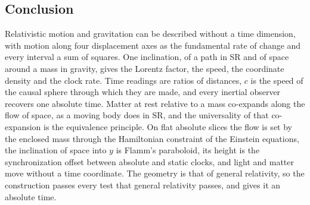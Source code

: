 \documentclass{iopjournal}
\begin{document}
\subsection{Conclusion}

Relativistic motion and gravitation can be described without a time dimension, with motion along four displacement axes as the fundamental rate of change and every interval a sum of squares. One inclination, of a path in SR and of space around a mass in gravity, gives the Lorentz factor, the speed, the coordinate density and the clock rate. Time readings are ratios of distances, $c$ is the speed of the causal sphere through which they are made, and every inertial observer recovers one absolute time. Matter at rest relative to a mass co-expands along the flow of space, as a moving body does in SR, and the universality of that co-expansion is the equivalence principle. On flat absolute slices the flow is set by the enclosed mass through the Hamiltonian constraint of the Einstein equations, the inclination of space into $y$ is Flamm's paraboloid, its height is the synchronization offset between absolute and static clocks, and light and matter move without a time coordinate. The geometry is that of general relativity, so the construction passes every test that general relativity passes, and gives it an absolute time.
\end{document}
